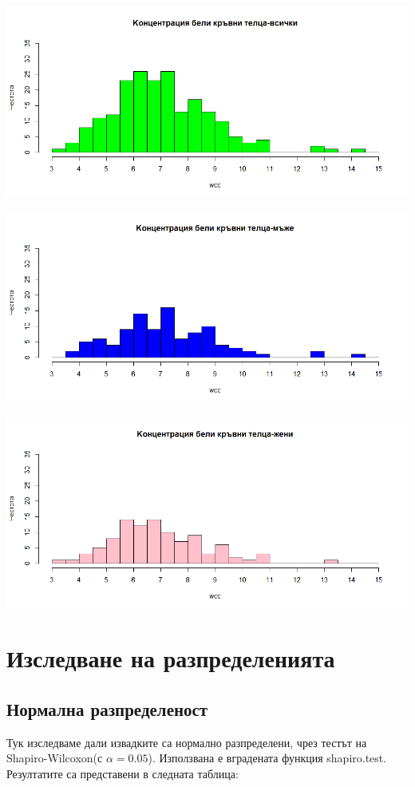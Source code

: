 \documentclass[12pt]{article}
\begin{document}
\begin{large}
\includegraphics[width=\textwidth,height=\textheight,keepaspectratio]{pics/wccall}

\includegraphics[width=\textwidth,height=\textheight,keepaspectratio]{pics/wccmen}

\includegraphics[width=\textwidth,height=\textheight,keepaspectratio]{pics/wccwomen}

\section{Изследване на разпределенията}

\subsection{Нормална разпределеност}
Тук изследваме дали извадките са нормално разпределени, чрез тестът на Shapiro-Wilcoxon(с $\alpha=0.05$). Използвана е вградената функция shapiro.test. Резултатите са представени в следната таблица:



\end{large}
\end{document}
